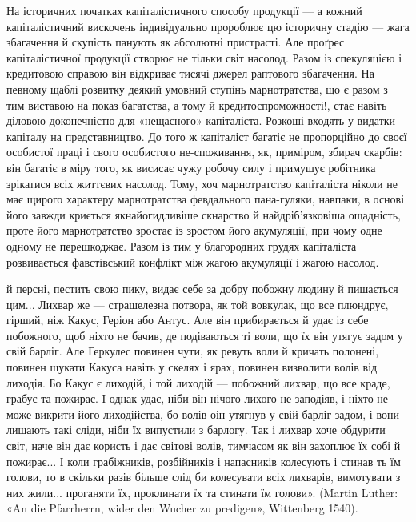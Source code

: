 На історичних початках капіталістичного способу продукції —
а кожний капіталістичний вискочень індивідуально пророблює
цю історичну стадію — жага збагачення й скупість панують як
абсолютні пристрасті. Але проґрес капіталістичної продукції
створює не тільки світ насолод. Разом із спекуляцією і кредитовою
справою він відкриває тисячі джерел раптового збагачення. На
певному щаблі розвитку деякий умовний ступінь марнотратства,
що є разом з тим виставою на показ багатства, а тому й кредитоспроможності!,
стає навіть діловою доконечністю для «нещасного»
капіталіста. Розкоші входять у видатки капіталу на представництво.
До того ж капіталіст багатіє не пропорційно до своєї особистої
праці і свого особистого не-споживання, як, приміром,
збирач скарбів: він багатіє в міру того, як висисає чужу робочу
силу і примушує робітника зрікатися всіх життєвих насолод.
Тому, хоч марнотратство капіталіста ніколи не має щирого
характеру марнотратства февдального пана-гуляки, навпаки,
в основі його завжди криється якнайогидливіше скнарство й
найдріб’язковіша ощадність, проте його марнотратство зростає
із зростом його акумуляції, при чому одне одному не перешкоджає.
Разом із тим у благородних грудях капіталіста розвивається
фавстівський конфлікт між жагою акумуляції і жагою насолод.

й персні, пестить свою пику, видає себе за добру побожну людину
й пишається цим... Лихвар же — страшелезна потвора, як той вовкулак,
що все плюндрує, гірший, ніж Какус, Геріон або Антус. Але він
прибирається й удає із себе побожного, щоб ніхто не бачив, де подіваються
ті воли, що їх він утягує задом у свій барліг. Але Геркулес повинен
чути, як ревуть воли й кричать полонені, повинен шукати Какуса навіть
у скелях і ярах, повинен визволити волів від лиходія. Бо Какус є лиходій,
і той лиходій — побожний лихвар, що все краде, грабує та пожирає.
І однак удає, ніби він нічого лихого не заподіяв, і ніхто не може викрити
його лиходійства, бо волів оін утягнув у свій барліг задом, і вони лишають
такі сліди, ніби їх випустили з барлогу. Так і лихвар хоче обдурити
світ, наче він дає користь і дає світові волів, тимчасом як він
захоплює їх собі й пожирає... І коли грабіжників, розбійників і напасників
колесують і стинав ть їм голови, то в скільки разів більше слід
би колесувати всіх лихварів, вимотувати з них жили... проганяти їх,
проклинати їх та стинати їм голови». (Martin Luther: «An die Pfarrherrn,
wider den Wucher zu predigen», Wittenberg 1540).
